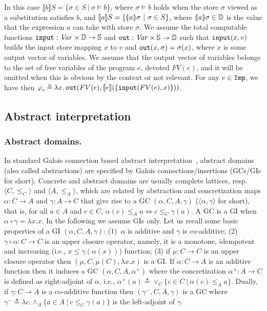 \documentclass[runningheads]{llncs}
\def\ok#1{\mbox{\raisebox{0ex}[1ex][1ex]{$#1$}}}
\def\Imp{\tt Imp}
\def\grasseb#1{{\llparenthesis\hspace*{0.2ex} #1 \hspace*{0.2ex}\rrparenthesis}}
\def\grasse#1{{\llbracket #1 \rrbracket}}
\newcommand{\scl}{\mathbb{S}}
\newcommand{\Domain}{\mathbb{D}}
\newcommand{\pfunction}[3]{\ok{\varphi^{#2\, #3}_{#1}}}
\newcommand{\Var}{\ensuremath{\mathit{Var}}}
\newcommand{\ra}{\rightarrow}
\newcommand{\Lra}{\Leftrightarrow}
\def\defi{\triangleq}
\newcommand{\ud}{\ok{\:\triangleq\:}}
\def\ok#1{\mbox{\raisebox{0ex}[1ex][1ex]{$#1$}}}
\newcommand{\sset}[2]{\{#1  ~|~ #2\}}
\def\tuple#1{\langle #1 \rangle}
\begin{document}
In this case
$\grasse{b}S=\sset{\sigma\in S}{\sigma\models b}$, where $\sigma\models b$ holds when the store $\sigma$ viewed as a substitution satisfies $b$, and $\grasse{a}S=\sset{\grasseb{a}\sigma}{\sigma\in S}$, where $\grasseb{a}\sigma\in\Domain$ is the value that the expression $a$ can take with store $\sigma$. We assume the total computable functions ${\tt input}:\Var\times\Domain\ra\scl$ and ${\tt out}:\Var\times\scl\ra\Domain$ such that 
${\tt input}(x,v)$ builds the input store mapping $x$ to $v$ and
${\tt out}(x,\sigma) = \sigma(x)$, where $x$ is some output vector of variables. We assume that the output vector of variables belongs to the set of free variables of the program $e$, devoted $FV(e)$, and it will be omitted when this is obvious by the context or not relevant.
For any $e\in\Imp$, we have then $\pfunction{e}{}{}\ud \lambda x.\,{\tt out}(FV(e),\grasse{e}(\{{\tt input}(FV(e),x)\}))$. 

\subsection{Abstract interpretation} \label{cc-sec}

\subsubsection{Abstract domains.}
In standard Galois connection based abstract interpretation~\cite{CC77,CC79}, 
abstract domains (also called abstractions) are specified by Galois connections/insertions
(GCs/GIs for short). 
Concrete and abstract domains are usually complete lattices, resp.\ $\tuple{C,\leq_C}$ and
$\tuple{A,\leq_A}$,
which are related by abstraction and concretization maps
$\alpha:C\ra A$ and $\gamma:A \ra C$ that give
rise to a GC $(\alpha,C,A,\gamma)$ ($\tuple{\alpha,\gamma}$ for short), that is,
for all $a\in A$ and $c\in C$,
$\alpha(c) \leq_A a \Lra c \leq_C \gamma(a)$. 
A GC is a GI when $\alpha\circ\gamma=\lambda x.x$. In the following we assume GIs only.
Let us recall some basic properties of a GI
$(\alpha,C,A,\gamma)$: (1)~$\alpha$ is additive and  $\gamma$ is co-additive;  
(2)~$\gamma\circ \alpha: C\ra C$ is an upper closure operator, namely, it is 
a monotone, idempotent and increasing (i.e., $x \leq \gamma(\alpha(x))$) function; (3) if $\mu:C\ra C$ is an upper closure operator
then $(\mu,C,\mu(C),\lambda x.x)$ is a GI. 
If $\alpha:C\ra A$ is an additive function then it induces a GC $(\alpha,C,A,\alpha^+)$ 
where the concretization $\alpha^+:A \ra C$ is defined as right-adjoint of $\alpha$, i.e., 
$\alpha^+(a) \defi \vee_C \{c\in C  ~|~ \alpha(c) \leq_A a\}$. Dually, 
if $\gamma:C\ra A$ is a co-additive function then $(\gamma^-,C,A,\gamma)$ is a GC where
$\gamma^- \defi \lambda c. \wedge_A \{a\in A  ~|~ c \leq_C \gamma(a)\}$ is the left-adjoint of $\gamma$. 
\end{document}
